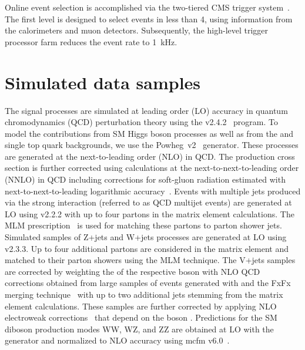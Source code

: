 %                                                                                                                                                                                                    
%                                                                                                                                                                                                    
Online event selection is accomplished via the two-tiered CMS trigger
system~\cite{1748-0221-12-01-P01020}. The first level is designed to select events in less than
4\mus, using information from the calorimeters and muon detectors.
%                                                                                                                                                                                                    
Subsequently, the high-level trigger processor farm reduces the event rate to 1~kHz.


\section{Simulated data samples}

The signal processes are simulated at leading order (LO) accuracy in quantum chromodynamics (QCD) perturbation theory using the  v2.4.2~\cite{amcatnlo} program.
%
To model the contributions from SM Higgs boson processes as well as
from the \ttbar and single top quark backgrounds, we use the {\sc Powheg~v2}~\cite{Nason:2004rx,Frixione:2007vw,Alioli:2010xd} generator. These processes are generated at the next-to-leading order (NLO) in QCD. The \ttbar production 
cross section is further corrected using calculations at the next-to-next-to-leading order (NNLO) in QCD including corrections for soft-gluon radiation estimated with next-to-next-to-leading logarithmic accuracy~\cite{ttbarNNLO}. 
% 
Events with multiple jets produced via the strong interaction (referred to as QCD multijet events) are generated at LO using  v2.2.2 with up to four partons in the matrix element calculations. The MLM prescription~\cite{mlm} is used for matching these partons to parton shower jets.
%
Simulated samples of Z+jets and W+jets processes are generated at LO using  v2.3.3. Up to four additional partons are considered in the matrix element and matched to their parton showers using the MLM technique.
%
The V+jets samples are corrected by weighting the \pt of the respective boson with NLO QCD corrections obtained from large samples of events generated with  and the FxFx merging technique~\cite{fxfx} with up to two additional jets stemming from the matrix element calculations.
%
These samples are further corrected by applying NLO electroweak corrections~\cite{Kuhn:2005gv,Kallweit:2015fta,Kallweit:2015dum} that depend on the boson \pt.
%
Predictions for the SM diboson production modes WW, WZ, and ZZ are obtained at LO with the {\sc {}}~\cite{Sjostrand:2014zea} generator and normalized to NLO accuracy using {\sc mcfm v6.0}~\cite{MCFM}. 
%


